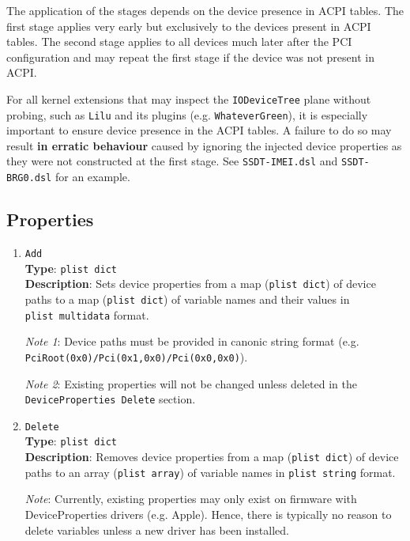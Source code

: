 \documentclass[]{article}
\makeatletter
\renewcommand{\label}[1]{%
\zref@wrapper@immediate{\oldlabel{#1}}}  %
\makeatother
\begin{document}
The application of the stages depends on the device presence in ACPI tables.
The first stage applies very early but exclusively to the devices present in ACPI tables.
The second stage applies to all devices much later after the PCI configuration
and may repeat the first stage if the device was not present in ACPI.

For all kernel extensions that may inspect the \texttt{IODeviceTree} plane without probing,
such as \texttt{Lilu} and its plugins (e.g. \texttt{WhateverGreen}), it is especially
important to ensure device presence in the ACPI tables. A failure to do so may result
\textbf{in erratic behaviour} caused by ignoring the injected device properties
as they were not constructed at the first stage. See \texttt{SSDT-IMEI.dsl} and
\texttt{SSDT-BRG0.dsl} for an example.

\subsection{Properties}\label{devpropsprops}

\begin{enumerate}
\item
  \texttt{Add}\\
  \textbf{Type}: \texttt{plist\ dict}\\
  \textbf{Description}: Sets device properties from a map (\texttt{plist\ dict})
  of device paths to a map (\texttt{plist\ dict}) of variable names and their values
  in \texttt{plist\ multidata} format.

  \emph{Note 1}: Device paths must be provided in canonic string format
  (e.g. \texttt{PciRoot(0x0)/Pci(0x1,0x0)/Pci(0x0,0x0)}).

  \emph{Note 2}: Existing properties will not be changed unless deleted
  in the \texttt{DeviceProperties\ Delete} section.

\item
  \texttt{Delete}\\
  \textbf{Type}: \texttt{plist\ dict}\\
  \textbf{Description}: Removes device properties from a map (\texttt{plist\ dict})
  of device paths to an array (\texttt{plist\ array}) of variable names in
  \texttt{plist\ string} format.

  \emph{Note}: Currently, existing properties may only exist on firmware
  with DeviceProperties drivers (e.g. Apple). Hence, there is typically
  no reason to delete variables unless a new driver has been installed.

\end{enumerate}
\end{document}

